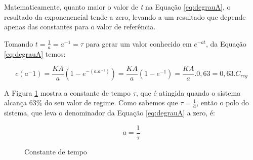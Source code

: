






Matematicamente, quanto maior o valor de \emph{t} na Equação \ref{eq:degrauA}, o resultado da exponenencial tende a zero, levando a um resultado que depende apenas das constantes para o valor de referência. 

Tomando $t= \frac{1}{a} = a^{-1} = \tau$ para gerar um valor conhecido em $e^{-at}$, da Equação \ref{eq:degrauA} temos:


\begin{equation}
c(a^-1) = \frac{KA}{a}(1-e^{-(a.a^{-1})}) = \frac{KA}{a}(1-e^{-1}) = \frac{KA}{a}.0,63 = 0,63 . C_{reg}
\end{equation}

A Figura \ref{fig:constTempo} mostra a constante de tempo $\tau$, que é atingida quando o sistema alcança 63\% do seu valor de regime. Como sabemos que $\tau = \frac{1}{a}$, então o polo do sistema, que leva o denominador da Equação \ref{eq:degrauA} a zero, é:

\begin{equation}
a = \frac{1}{\tau}
\end{equation}



\begin{figure}
\centering
\caption{Constante de tempo}
\label{fig:constTempo}
\end{figure}

